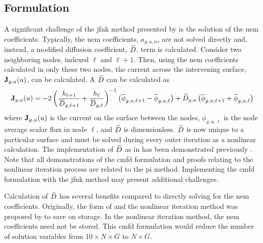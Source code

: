   \subsection{ Formulation}
    \label{sec:cmfd_formulation}

    A significant challenge of the \gls{jfnk} method presented by
    \citeauthor{qe2paper} is the solution of the \gls{nem} coefficients.
    Typically, the \gls{nem} coefficients, $a_{g,u,n}$, are not solved directly
    and, instead, a modified diffusion coefficient, $\widetilde{D}$, term is
    calculated. Consider two neighboring nodes, indexed $\ell$ and $\ell+1$.
    Then, using the \gls{nem} coefficients calculated in only these two nodes,
    the current across the intervening surface, $\mathbf{J}_{g,u}(u)$, can be
    calculated. A $\widetilde{D}$ can be calculated as
    \begin{equation}
      \label{eq:dtilde}
      \mathbf{J}_{g,u}(u) = 
        -2 \left( \frac{h_{\ell+1}}{\overline{D}_{g,\ell+1}} + 
          \frac{h_{\ell}}{\overline{D}_{g,\ell}} \right)^{-1}
          \left( \overline{\phi}_{g,u,\ell+1} -
          \overline{\phi}_{g,u,\ell} \right) + 
        \widetilde{D}_{g,u} \left( \overline{\phi}_{g,u,\ell+1} +
          \overline{\phi}_{g,u,\ell} \right)
    \end{equation}
    where $\mathbf{J}_{g,u}(u)$ is the current on the surface between the nodes,
    $\overline{\phi}_{g,u,\ell}$ is the node average scalar flux in node $\ell$,
    and $\widetilde{D}$ is dimensionless. $\widetilde{D}$ is now unique to a particular
    surface and must be solved during every outer iteration as a nonlinear
    calculation. The implementation of $\widetilde{D}$ as in  has been
    demonstrated previously \cite{smith_nonlinear,palmtagThesis}. Note that all
    demonstrations of the \gls{cmfd} formulation and proofs relating to the
    nonlinear iteration process are related to the \gls{pi} method. Implementing
    the \gls{cmfd} formulation with the \gls{jfnk} method may present additional
    challenges.

    Calculation of $\widetilde{D}$ has several benefits compared to directly solving
    for the \gls{nem} coefficients. Originally, the form of  and
    the nonlinear iteration method was proposed by \citeauthor{smith_nonlinear}
    to save on storage. In the nonlinear iteration method, the \gls{nem}
    coefficients need not be stored. This \gls{cmfd} formulation would reduce
    the number of solution variables from ${10 \times N \times G}$ to 
    ${N \times G}$.

